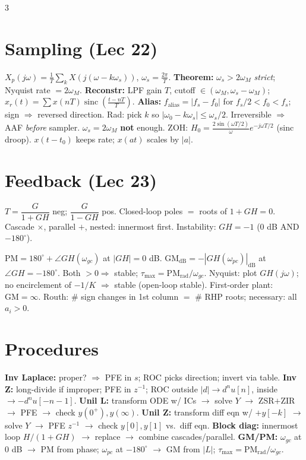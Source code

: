 \documentclass[8pt]{extarticle}
\DeclareMathOperator{\sinc}{sinc}
\begin{document}
\begin{multicols*}{3}

\section*{Sampling (Lec 22)}
$X_p(j\omega){=}\tfrac{1}{T}\sum_k X(j(\omega{-}k\omega_s))$, $\omega_s{=}\tfrac{2\pi}{T}$.
\textbf{Theorem:} $\omega_s>2\omega_M$ \emph{strict}; Nyquist rate $=2\omega_M$.
\textbf{Reconstr:} LPF gain $T$, cutoff $\in(\omega_M,\omega_s{-}\omega_M)$; $x_r(t){=}\sum x(nT)\sinc(\tfrac{t-nT}{T})$.
\textbf{Alias:} $f_{\text{alias}}{=}|f_s{-}f_0|$ for $f_s/2{<}f_0{<}f_s$; sign $\Rightarrow$ reversed direction. Rad: pick $k$ so $|\omega_0-k\omega_s|{\le}\omega_s/2$.
Irreversible $\Rightarrow$ AAF \emph{before} sampler.
$\omega_s=2\omega_M$ \textbf{not} enough.
ZOH: $H_0{=}\tfrac{2\sin(\omega T/2)}{\omega}e^{-j\omega T/2}$ (sinc droop).
$x(t{-}t_0)$ keeps rate; $x(at)$ scales by $|a|$.

\section*{Feedback (Lec 23)}
$T{=}\dfrac{G}{1{+}GH}$ neg; $\dfrac{G}{1{-}GH}$ pos.
Closed-loop poles $=$ roots of $1{+}GH{=}0$.
Cascade $\times$, parallel $+$, nested: innermost first.
Instability: $GH{=}{-}1$ (0 dB AND $-180^\circ$).

$\mathrm{PM}{=}180^\circ{+}\angle GH(\omega_{gc})$ at $|GH|{=}0$ dB.
$\mathrm{GM}_\mathrm{dB}{=}{-}|GH(\omega_{pc})|_\mathrm{dB}$ at $\angle GH{=}{-}180^\circ$.
Both $>0 \Rightarrow$ stable; $\tau_{\max}{=}\mathrm{PM}_\mathrm{rad}/\omega_{gc}$.
Nyquist: plot $GH(j\omega)$; no encirclement of $-1/K$ $\Rightarrow$ stable (open-loop stable).
First-order plant: $\mathrm{GM}{=}\infty$.
Routh: \# sign changes in 1st column $=$ \# RHP roots; necessary: all $a_i>0$.

\section*{Procedures}
\textbf{Inv Laplace:} proper? $\Rightarrow$ PFE in $s$; ROC picks direction; invert via table.
\textbf{Inv Z:} long-divide if improper; PFE in $z^{-1}$; ROC outside $|d|{\to}d^nu[n]$, inside ${\to}{-}d^nu[-n{-}1]$.
\textbf{Unil L:} transform ODE w/ ICs $\to$ solve $Y$ $\to$ ZSR$+$ZIR $\to$ PFE $\to$ check $y(0^+),y(\infty)$.
\textbf{Unil Z:} transform diff eqn w/ $+y[-k]$ $\to$ solve $Y$ $\to$ PFE $z^{-1}$ $\to$ check $y[0],y[1]$ vs.\ diff eqn.
\textbf{Block diag:} innermost loop $H/(1{+}GH)$ $\to$ replace $\to$ combine cascades/parallel.
\textbf{GM/PM:} $\omega_{gc}$ at 0 dB $\to$ PM from phase; $\omega_{pc}$ at $-180^\circ$ $\to$ GM from $|L|$; $\tau_{\max}{=}\mathrm{PM}_\mathrm{rad}/\omega_{gc}$.


\end{multicols*}
\end{document}
